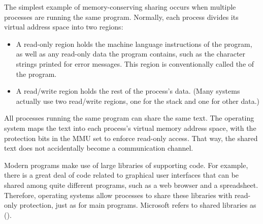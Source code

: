 The simplest example of memory-conserving sharing occurs when multiple
processes are running the same program.  Normally, each process divides
its virtual address space into two regions:
\begin{itemize}
\item
A read-only region holds the machine language instructions of the
program, as well as any read-only data the program contains, such as
the character strings printed for error messages.  This region is
conventionally called the  of the program.
\item
A read/write region holds the rest of the process's data.  (Many
systems actually use two read/write regions, one for the stack and one
for other data.)
\end{itemize}
All processes running the same program can share the same text.  The
operating system maps the text into each process's virtual memory address
space, with the protection bits in the MMU set to enforce read-only
access.  That way, the shared text does not accidentally become a
communication channel.

Modern programs make use of large libraries of supporting
code.  For example, there is a great deal of code related to graphical
user interfaces that can be shared among quite different programs,
such as a web browser and a spreadsheet.  Therefore, operating systems
allow processes to share these libraries with read-only protection,
just as for main programs.  Microsoft refers to shared libraries as
 ().

